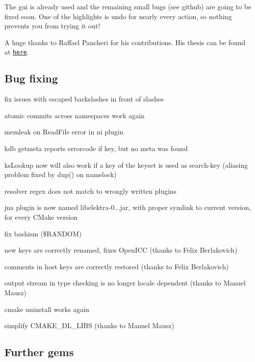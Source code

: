 The gui is already used and the remaining small bugs (see github) are going to be fixed soon. One of the highlights is undo for nearly every action, so nothing prevents you from trying it out!

A huge thanks to Raffael Pancheri for his contributions. His thesis can be found at \href{http://www.libelektra.org/ftp/elektra/pancheri2015gui.pdf}{\tt here}.

\subsection*{Bug fixing}


\begin{DoxyItemize}
\item fix issues with escaped backslashes in front of slashes
\item atomic commits across namespaces work again
\item memleak on Read\+File error in ni plugin
\item {\ttfamily kdb getmeta} reports errorcode if key, but no meta was found
\item {\ttfamily ks\+Lookup} now will also work if a key of the keyset is used as search-\/key (aliasing problem fixed by dup() on namelock)
\item resolver regex does not match to wrongly written plugins
\item jna plugin is now named libelektra-\/0...\+jar, with proper symlink to current version, for every C\+Make version
\item fix bashism (\$\+R\+A\+N\+D\+O\+M)
\item new keys are correctly renamed, fixes Open\+I\+C\+C (thanks to Felix Berlakovich)
\item comments in host keys are correctly restored (thanks to Felix Berlakovich)
\item output stream in type checking is no longer locale dependent (thanks to Manuel Mausz)
\item cmake uninstall works again
\item simplify C\+M\+A\+K\+E\+\_\+\+D\+L\+\_\+\+L\+I\+B\+S (thanks to Manuel Mausz)
\end{DoxyItemize}

\subsection*{Further gems}


